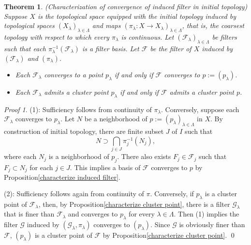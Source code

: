 \documentclass[a4paper,12pt]{article}
\newtheorem{thm}{Theorem}[section]
\theoremstyle{remark}
\newtheorem*{prf}{Proof}
\theoremstyle{definition}
\theoremstyle{definition}
\theoremstyle{definition}
\begin{document}
\begin{thm}\label{characterize convergence of induced filter} (Characterization of convergence of induced filter in initial topology)
	Suppose \( X \) is the topological space equipped with the initial topology induced by topological spaces \( (X_{\lambda})_{\lambda \in \Lambda} \) and maps \( (\pi_{\lambda}:X \to X_{\lambda})_{\lambda \in \Lambda} \), that is, the coarsest topology with respect to which every \( \pi_{\lambda} \) is continuous.
	Let \( (\mathscr{F}_{\lambda})_{\lambda \in \Lambda} \) be filters such that each \( \pi_{\lambda}^{-1}(\mathscr{F}_{\lambda}) \) is a filter basis.
	Let \( \mathscr{F} \) be the filter of \( X \) induced by \( (\mathscr{F}_{\lambda}) \) and \( (\pi_{\lambda}) \).
	\begin{itemize}
		\item[(1)] Each \( \mathscr{F}_{\lambda} \) converges to a point \( p_{\lambda}\) if and only if \( \mathscr{F} \) converges to \( p:=(p_{\lambda}) \).

		\item[(2)] Each \( \mathscr{F}_{\lambda} \) admits a cluster point \( p_{\lambda} \) if and only if \( \mathscr{F} \) admits a cluster point \( p \).
	\end{itemize}
\end{thm}
\begin{prf}
	(1): Sufficiency follows from continuity of \( \pi_{\lambda} \). Conversely, suppose each \( \mathscr{F}_{\lambda} \) converges to \( p_{\lambda} \).
	Let \( N \) be a neighborhood of \( p:=(p_{\lambda})_{\lambda \in \Lambda} \) in \( X \). By construction of initial topology, there are finite subset \( J \) of \( I \) such that
	\begin{equation*}
		N \supset \bigcap_{j \in J} \pi_{j}^{-1}(N_{j}),
	\end{equation*}
	where each \( N_j \) is a neighborhood of \( p_j \). There also exists \( F_j \in \mathscr{F}_j \) such that \( F_j \subset N_j \) for each \( j \in J \).
	This implies a basis of \( \mathscr{F} \) converges to \( p \) by Proposition\ref{characterize induced filter}.

	(2): Sufficiency follows again from continuity of \( \pi \). Conversely, if \( p_{\lambda} \) is a cluster point of \( \mathscr{F}_{\lambda} \), then, by Proposition\ref{characterize cluster point}, there is a filter \( \mathscr{G}_{\lambda} \) that is finer than \( \mathscr{F}_{\lambda} \) and converges to \( p_{\lambda} \) for every \( \lambda \in \Lambda \). Then (1) implies the filter \( \mathscr{G} \) induced by \( (\mathscr{G}_{\lambda}, \pi_{\lambda}) \) converges to \( (p_{\lambda}) \). Since \( \mathscr{G} \) is obviously finer than \( \mathscr{F} \), \( (p_{\lambda}) \) is a cluster point of \( \mathscr{F} \) by Proposition\ref{characterize cluster point}.
	\qed\end{prf}
\end{document}
